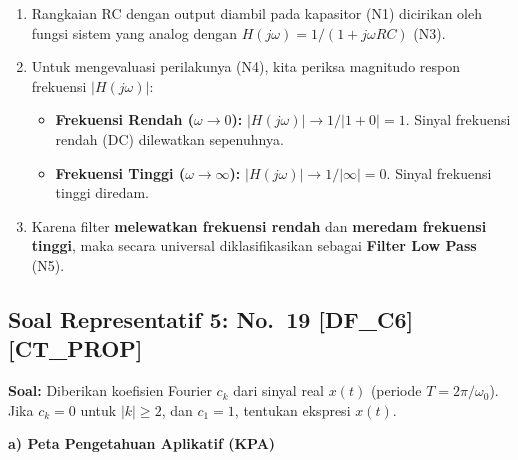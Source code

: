\documentclass[
  letterpaper,
  DIV=11,
  numbers=noendperiod]{scrreprt}
\providecommand{\tightlist}{%
  \setlength{\itemsep}{0pt}\setlength{\parskip}{0pt}}
\begin{document}
\begin{enumerate}
\def\labelenumi{\arabic{enumi}.}
\tightlist
\item
  Rangkaian RC dengan output diambil pada kapasitor (N1) dicirikan oleh
  fungsi sistem yang analog dengan \(H(j\omega) = 1 / (1 + j\omega RC)\)
  (N3).
\item
  Untuk mengevaluasi perilakunya (N4), kita periksa magnitudo respon
  frekuensi \(|H(j\omega)|\):

  \begin{itemize}
  \tightlist
  \item
    \textbf{Frekuensi Rendah (\(\omega \rightarrow 0\)):}
    \(|H(j\omega)| \rightarrow 1 / |1 + 0| = 1\). Sinyal frekuensi
    rendah (DC) dilewatkan sepenuhnya.
  \item
    \textbf{Frekuensi Tinggi (\(\omega \rightarrow \infty\)):}
    \(|H(j\omega)| \rightarrow 1 / |\infty| = 0\). Sinyal frekuensi
    tinggi diredam.
  \end{itemize}
\item
  Karena filter \textbf{melewatkan frekuensi rendah} dan \textbf{meredam
  frekuensi tinggi}, maka secara universal diklasifikasikan sebagai
  \textbf{Filter Low Pass} (N5).
\end{enumerate}

\subsection{Soal Representatif 5: No.~19
{[}DF\_C6{]}{[}CT\_PROP{]}}\label{soal-representatif-5-no.-19-df_c6ct_prop}

\textbf{Soal:} Diberikan koefisien Fourier \(c_k\) dari sinyal real
\(x(t)\) (periode \(T=2\pi/\omega_0\)). Jika \(c_k = 0\) untuk
\(|k| \ge 2\), dan \(c_1 = 1\), tentukan ekspresi \(x(t)\).

\textbf{a) Peta Pengetahuan Aplikatif (KPA)}
\end{document}
